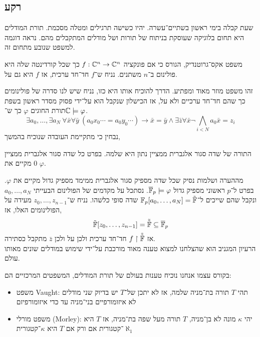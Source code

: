 \subsection{רקע}
שעת קבלה בימי ראשון בשתיים־עשרה.
יהיו כשישה תרגילים ומטלה מסכמת.
תורת המודלים היא תחום בלוגיקה שעוסקת בניתוח של תורות ושל מודלים המתקבלים מהם.
נראה דוגמה למשפט שנובע מתחום זה.
\begin{example}
	משפט אקס־גרוטנדיק, הגורס כי אם פונקציה $f : \mathbb{C}^n \to \mathbb{C}^n$ כך שכל קורדינטה שלה היא פולינום ב־$n$ משתנים.
	נניח ש־$f$ חד־חד ערכית, אז $f$ היא גם על.
\end{example}
זהו משפט מוזר מאוד ומפתיע.
הדרך להוכיח אותו היא כזו,
נניח שיש לנו סדרה של פולינומים כך שהם חד־חד ערכיים ולא על, אז הכישלון שנקבל הוא על־ידי פסוק מסדר ראשון בשפת תורת החוגים $\varphi$ כך ש־$\mathbb{C} \models \varphi$.
\[
	\exists a_0, \ldots, \exists a_{N}\ \forall \bar{x} \forall \bar{y}\ (a_0 x_0 \cdots = a_0 y_0 \cdots) \to \bar{x} = \bar{y}
	\land \exists \bar{z} \forall \bar{x} \lnot \bigwedge_{i < N} a_0 \bar{x} = z_i
\]
נבחין כי מתקיימת העובדה שנוכיח בהמשך,
\begin{remark}
	התורה של שדה סגור אלגברית ממציין נתון היא שלמה.
	בפרט כל שדה סגור אלגברית ממציין 0 מקיים את $\varphi$.
\end{remark}
מההערה ושלמות נסיק שכל שדה מספיק סגור אלגברית ממימד מספיק גדול מקיים את $\varphi$.
בפרט ל־$p$ ראשוני מספיק גדול $\overline{\mathbb{F}}_p \models \varphi$.
נסתכל על מקדמים של הפולינום הבעייתי $a_0, \ldots, a_{N}$ ונקבל שהם שייכים ל־$\mathbb{F}_p[a_0, \ldots, a_{N}] = \tilde{\mathbb{F}}$ שדה סופי כלשהו.
נניח ש־$z_{0}, \ldots, z_{n - 1}$ מעידה על הפולינומים האלו, אז,
\[
	\tilde{\mathbb{F}}[z_0, \ldots, z_{n - 1}] = \tilde{\tilde{\mathbb{F}}} \subseteq \overline{\mathbb{F}}_p 
\]
אז $f \restriction \tilde{\tilde{\mathbb{F}}}$ חד־חד ערכית ולכן על ולכן $\bar{z}$ מתקבל כסתירה. \\
הרעיון המגניב הוא שהצלחנו למצוא טענה מאוד מורכבת על־ידי שימוש במודלים שונים מאותו עולם.

בקורס עצמו אנחנו נוכיח טענות בעולם של תורת המודלים, המשפטים המרכזיים הם:
\begin{itemize}
	\item משפט Vaught: תהי $T$ תורה בת־מניה שלמה, אז לא יתכן של־$T$ יש בדיוק שני מודלים לא איזומורפיים בני־מניה עד כדי איזומורפיזם
	\item משפט מורלי (Morley): יהי $\kappa$ מונה לא בן־מניה, $T$ תורה מעל שפה בת־מניה, אז $T$ היא $\aleph_1$־קטגורית אם ורק אם $T$ היא $\kappa$־קטגורית
\end{itemize}

